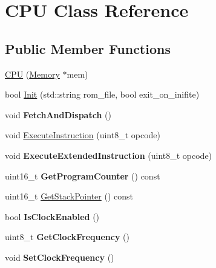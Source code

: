 \hypertarget{classCPU}{}\section{C\+PU Class Reference}
\label{classCPU}
\subsection*{Public Member Functions}
\begin{DoxyCompactItemize}
\item 
\mbox{\hyperlink{classCPU_a398bb4352a0dbaa9b2010f2084d9f8f7}{C\+PU}} (\mbox{\hyperlink{classMemory}{Memory}} $\ast$mem)
\item 
bool \mbox{\hyperlink{classCPU_a72afeb809bf193928349e6f948f60bfc}{Init}} (std\+::string rom\+\_\+file, bool exit\+\_\+on\+\_\+inifite)
\item 
\mbox{\label{classCPU_a2f9a20451dd54b219cc09a879ff483da}} 
void {\bfseries Fetch\+And\+Dispatch} ()
\item 
void \mbox{\hyperlink{classCPU_ad8e103aaedd1c250d33f9cc373f2f16b}{Execute\+Instruction}} (uint8\+\_\+t opcode)
\item 
\mbox{\label{classCPU_ac2cebcf2ac957a884175b94ff5f62c15}} 
void {\bfseries Execute\+Extended\+Instruction} (uint8\+\_\+t opcode)
\item 
\mbox{\label{classCPU_a7882dfef1d06166e828f917368493625}} 
uint16\+\_\+t {\bfseries Get\+Program\+Counter} () const
\item 
uint16\+\_\+t \mbox{\hyperlink{classCPU_a570d34ada158ddb45f8ba8dc0e5f218a}{Get\+Stack\+Pointer}} () const
\item 
\mbox{\label{classCPU_a66108f133258f1d4348e79f19287d4ed}} 
bool {\bfseries Is\+Clock\+Enabled} ()
\item 
\mbox{\label{classCPU_a852335312c1040d2fcde2a690443d425}} 
uint8\+\_\+t {\bfseries Get\+Clock\+Frequency} ()
\item 
\mbox{\label{classCPU_ab9ecfdbbe82fef8bff9443ff94b7ca70}} 
void {\bfseries Set\+Clock\+Frequency} ()
\item 
\mbox{\label{classCPU_ae6c57423f6edcd249286c73e8e620bb9}} 

\end{DoxyCompactItemize}
